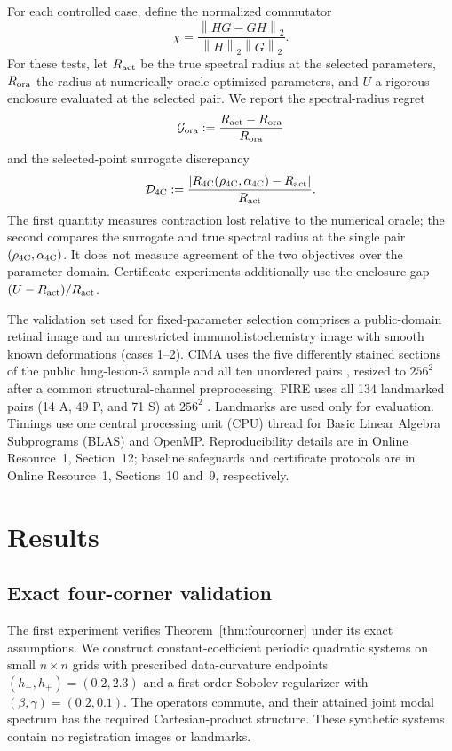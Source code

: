 \documentclass[pdflatex,iicol,sn-mathphys-num]{sn-jnl}
\theoremstyle{definition}
\newcommand{\norm}[1]{\left\lVert #1\right\rVert}
\begin{document}
For each controlled case, define the normalized commutator
\[
\chi=\frac{\norm{HG-GH}_2}{\norm H_2\norm G_2}.
\]
For these tests, let $R_{\rm act}$ be the true spectral radius at the selected
parameters, $R_{\rm ora}$ the radius at numerically oracle-optimized
parameters, and $U$ a rigorous enclosure evaluated at the selected pair. We
report the spectral-radius regret
\[
\mathcal G_{\rm ora}
:=\frac{R_{\rm act}-R_{\rm ora}}{R_{\rm ora}}
\]
and the selected-point surrogate discrepancy
\[
\mathcal D_{\rm 4C}
:=\frac{|R_{\rm 4C}(\rho_{\rm 4C},\alpha_{\rm 4C})
-R_{\rm act}|}{R_{\rm act}}.
\]
The first quantity measures contraction lost relative to the numerical oracle;
the second compares the surrogate and true spectral radius at the single pair
$(\rho_{\rm 4C},\alpha_{\rm 4C})$. It does not measure agreement of the two
objectives over the parameter domain. Certificate experiments additionally
use the enclosure gap $(U-R_{\rm act})/R_{\rm act}$.

The validation set used for fixed-parameter selection comprises a
public-domain retinal image and an unrestricted immunohistochemistry image
with smooth known deformations (cases 1--2). CIMA uses
the five differently stained sections of the public lung-lesion-3 sample and
all ten unordered pairs \cite{Borovec2018}, resized to $256^2$ after a common
structural-channel preprocessing. FIRE uses all 134 landmarked pairs (14 A, 49
P, and 71 S) at $256^2$ \cite{HernandezMatas2017}. Landmarks are used only for
evaluation. Timings use one central processing unit (CPU) thread for Basic
Linear Algebra Subprograms (BLAS) and OpenMP. Reproducibility details are in
Online Resource~1, Section~12; baseline safeguards and certificate protocols are in
Online Resource~1, Sections~10 and~9, respectively.

\section{Results}\label{sec:results}
\subsection{Exact four-corner validation}
The first experiment verifies Theorem~\ref{thm:fourcorner} under its exact
assumptions. We construct constant-coefficient periodic quadratic systems on
small $n\times n$ grids with prescribed data-curvature endpoints
$(h_-,h_+)=(0.2,2.3)$ and a first-order Sobolev regularizer with
$(\beta,\gamma)=(0.2,0.1)$. The operators commute, and their attained joint
modal spectrum has the required Cartesian-product structure. These synthetic
systems contain no registration images or landmarks.
\end{document}
